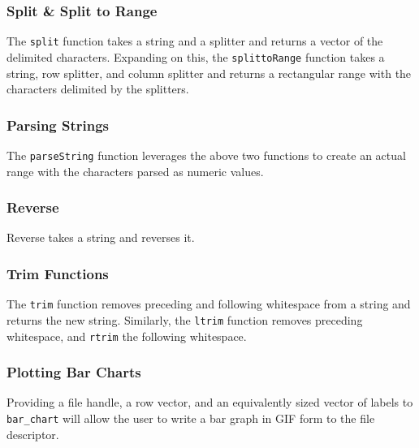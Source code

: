 		\subsubsection{Split \& Split to Range}
		The \texttt{split} function takes a string and a splitter and returns a vector of the delimited characters. Expanding on this, the \texttt{splittoRange} function takes a string, row splitter, and column splitter and returns a rectangular range with the characters delimited by the splitters.

		\subsubsection{Parsing Strings}
		The \texttt{parseString} function leverages the above two functions to create an actual range with the characters parsed as numeric values.

		\subsubsection{Reverse}
		Reverse takes a string and reverses it.

		\subsubsection{Trim Functions}
		The \texttt{trim} function removes preceding and following whitespace from a string and returns the new string. Similarly, the \texttt{ltrim} function removes preceding whitespace, and \texttt{rtrim} the following whitespace.

		\subsubsection{Plotting Bar Charts}
		Providing a file handle, a row vector, and an equivalently sized vector of labels to \texttt{bar\_chart} will allow the user to write a bar graph in GIF form to the file descriptor.
